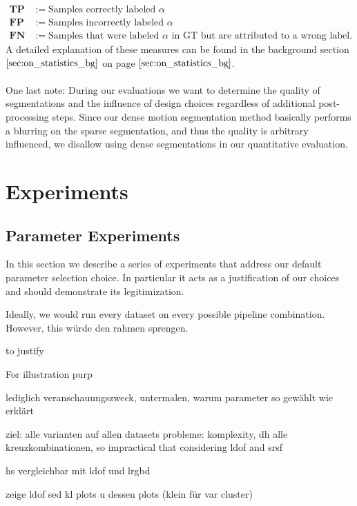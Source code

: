 \begin{equation}
\begin{aligned}
	\textbf{TP} &:= \text{Samples correctly labeled $\alpha$} \\
	\textbf{FP} &:= \text{Samples incorrectly labeled $\alpha$} \\
	\textbf{FN} &:= \text{Samples that were labeled $\alpha$ in GT but are attributed to a wrong label.}
\end{aligned}
\label{eq:statistical_counts}
\end{equation}
A detailed explanation of these measures can be found in the background section $\ref{sec:on_statistics_bg}$ on page $\pageref{sec:on_statistics_bg}$. \\ \\
One last note: During our evaluations we want to determine the quality of segmentations and the influence of design choices regardless of additional post-processing steps. Since our dense motion segmentation method basically performs a blurring on the sparse segmentation, and thus the quality is arbitrary influenced, we disallow using dense segmentations in our quantitative evaluation.

\section{Experiments}
\subsection{Parameter Experiments}
\label{sec:parameter_experiments}
In this section we describe a series of experiments that address our default parameter selection choice. In particular it acts as a justification of our choices and should demonstrate its legitimization.

Ideally, we would run every dataset on every possible pipeline combination. However, this würde den rahmen sprengen.

to justify

For illustration purp

lediglich veranschauungszweck, untermalen, warum parameter so gewählt wie erklärt

ziel: alle varianten auf allen datasets
probleme: komplexity, dh alle kreuzkombinationen, so impractical that considering ldof and srsf

hs vergleichbar mit ldof und lrgbd 

zeige ldof sed kl
plots
u dessen plots (klein für var cluster)


